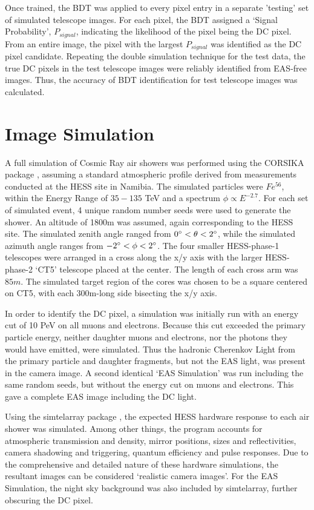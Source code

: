 \documentclass[]{article}
\begin{document}
Once trained, the BDT was applied to every pixel entry in a separate 'testing' set of simulated telescope images. For each pixel, the BDT assigned a \textquoteleft Signal Probability', $P_{signal}$, indicating the likelihood of the pixel being the DC pixel. From an entire image, the pixel with the largest $P_{signal}$ was identified as the DC pixel candidate. Repeating the double simulation technique for the test data, the true DC pixels in the test telescope images were reliably identified from EAS-free images. Thus, the accuracy of BDT identification for test telescope images was calculated.

\section{Image Simulation}
A full simulation of Cosmic Ray air showers was performed using the CORSIKA package \cite{Heck98}, assuming a standard atmospheric profile derived from measurements conducted at the HESS site in Namibia. The simulated particles were $Fe^{56}$, within the Energy Range of $35-135$ TeV and a spectrum $\phi \propto E^{-2.7}$. For each set of simulated event, 4 unique random number seeds were used to generate the shower. An altitude of 1800m was assumed, again corresponding to the HESS site. The simulated zenith angle ranged from $0\degree < \theta < 2 \degree$, while the simulated azimuth angle ranges from $-2\degree < \phi < 2 \degree$. The four smaller HESS-phase-1 telescopes were arranged in a cross along the x/y axis with the larger HESS-phase-2 \textquoteleft CT5' telescope placed at the center. The length of each cross arm was $85m$. The simulated target region of the cores was chosen to be a square centered on CT5, with each 300m-long side bisecting the x/y axis.

In order to identify the DC pixel, a simulation was initially run with an energy cut of 10 PeV on all muons and electrons. Because this cut exceeded the primary particle energy, neither daughter muons and electrons, nor the photons they would have emitted, were simulated. Thus the hadronic Cherenkov Light from the primary particle and daughter fragments, but not the EAS light, was present in the camera image. A second identical \textquoteleft EAS Simulation' was run including the same random seeds, but without the energy cut on muons and electrons. This gave a complete EAS image including the DC light.

Using the sim\textunderscore telarray package \cite{Bernlohr08}, the expected HESS hardware response to each air shower was simulated. Among other things, the program accounts for atmospheric transmission and density, mirror positions, sizes and reflectivities, camera shadowing and triggering, quantum efficiency and pulse responses. Due to the comprehensive and detailed nature of these hardware simulations, the resultant images can be considered \textquoteleft realistic camera images'. For the EAS Simulation, the night sky background was also included by sim\textunderscore telarray, further obscuring the DC pixel.
\end{document}
